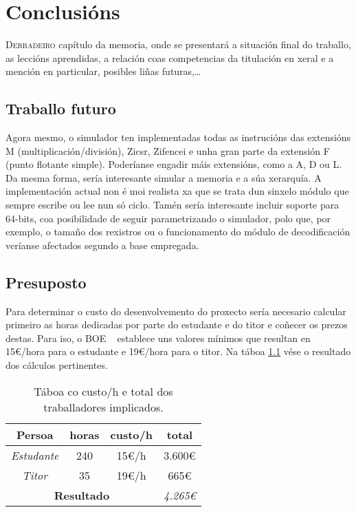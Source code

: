 \chapter{Conclusións}
\label{chap:conclusions}

\lettrine{D}{erradeiro} capítulo da memoria, onde se presentará a situación final do traballo, as leccións aprendidas, a relación coas competencias da titulación en xeral e a mención en particular, posibles liñas futuras,\dots

\section{Traballo futuro}\label{sec:traballo_futuro}
Agora mesmo, o simulador ten implementadas todas as instrucións das extensións M (multiplicación/división), Zicsr, Zifencei e unha gran parte da extensión F (punto flotante simple). Poderíanse engadir máis extensións, como a A, D ou L. Da mesma forma, sería interesante simular a memoria e a súa xerarquía. A implementación actual non é moi realista xa que se trata dun sinxelo módulo que sempre escribe ou lee nun só ciclo. Tamén sería interesante incluir soporte para 64-bits, coa posibilidade de seguir parametrizando o simulador, polo que, por exemplo, o tamaño dos rexistros ou o funcionamento do módulo de decodificación veríanse afectados segundo a base empregada.


\section{Presuposto}\label{sec:presuposto}
Para determinar o custo do desenvolvemento do proxecto sería necesario calcular primeiro as horas dedicadas por parte do estudante e do titor e coñecer os prezos destas. Para iso, o BOE ~\cite{boe} establece uns valores mínimos que resultan en 15€/hora para o estudante e 19€/hora para o titor. Na táboa \ref{tab:salario} vése o resultado dos cálculos pertinentes.

\begin{table}[hp!]
    \centering
    \begin{tabular}{c|c|c|c}
    \rowcolor{udcpink!25}
    \textbf{Persoa} & \textbf{horas}  & \textbf{custo/h} & \textbf{total} 
    \\\hline
    \textit{Estudante} & 240 & 15€/h & 3.600€\\
    \textit{Titor} & 35 & 19€/h & 665€\\
    \multicolumn{3}{c|}{\textbf{Resultado}} & \textit{4.265€} \\
    \end{tabular}
    \caption{Táboa co custo/h e total dos traballadores implicados.}
    \label{tab:salario}
\end{table}

